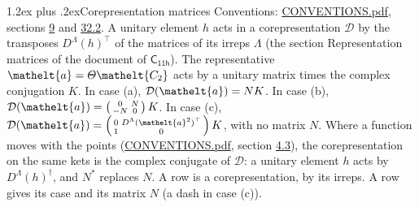 \documentclass[10pt,a4paper]{article}
\makeatletter
\renewcommand\section{\@startsection{section}{1}{\z@}{-3ex plus -1ex minus -.2ex}%
  {1.2ex plus .2ex}{\normalfont\large\sffamily\bfseries\color{parttitle}}}
\numberwithin{equation}{section}
\newcommand{\eltfont}[1]{{\let\sigma\eltsigma\mathelt{#1}}}
\newcommand{\grp}[1]{\mathsf{#1}}
\newcommand{\elt}[1]{\eltfont{#1}}
\makeatother
\begin{document}
\section{Corepresentation matrices}\label{s:corep_matrices}
Conventions: \href{../../CONVENTIONS.pdf}{CONVENTIONS.pdf}, sections \href{../../../rotation/CONVENTIONS.pdf\#conv.9}{9} and \href{../../CONVENTIONS.pdf\#conv.32.2}{32.2}.
A unitary element $h$ acts in a corepresentation $\mathcal{D}$ by the transposes $D^{\Lambda}(h)^{\top}$ of the matrices of its irreps $\Lambda$ (the section Representation matrices of the document of \href{../../../rotation/data/pdf/C11h.pdf}{$\grp{C_{11h}}$}). The representative $\elt{a} = \varTheta\elt{C_{2}}$ acts by a unitary matrix times the complex conjugation $K$.
In case (a), $\mathcal{D}(\elt{a}) = NK$. In case (b), $\mathcal{D}(\elt{a}) = \left(\begin{smallmatrix} 0 & N \\ -N & 0 \end{smallmatrix}\right) K$. In case (c), $\mathcal{D}(\elt{a}) = \left(\begin{smallmatrix} 0 & D^{\Lambda}(\elt{a}^2)^{\top} \\ 1 & 0 \end{smallmatrix}\right) K$, with no matrix $N$.
Where a function moves with the points (\href{../../CONVENTIONS.pdf}{CONVENTIONS.pdf}, section \href{../../../rotation/CONVENTIONS.pdf\#conv.4.3}{4.3}), the corepresentation on the same kets is the complex conjugate of $\mathcal{D}$: a unitary element $h$ acts by $D^{\Lambda}(h)^{\dagger}$, and $N^{*}$ replaces $N$.
A row is a corepresentation, by its irreps. A row gives its case and its matrix $N$ (a dash in case (c)).
\end{document}
